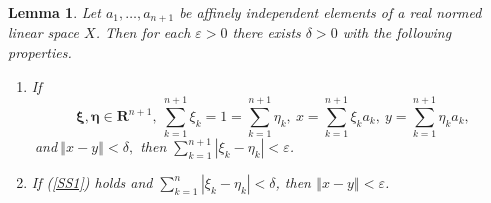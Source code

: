 \documentclass[11pt]{article}%
\newtheorem{lemma}[theorem]{Lemma}
\begin{document}
\begin{lemma}
\label{aug04l1A}Let $a_{1},\ldots,a_{n+1}$ be affinely independent elements of
a real normed linear space $X$. Then for each $\varepsilon>0$ there exists
$\delta>0$ with the following properties.

\begin{enumerate}
\item[\emph{(i)}] If%
\begin{equation}
\ \mathbf{\xi},\mathbf{\eta}\in\mathbf{R}^{n+1},\ \sum_{k=1}^{n+1}\xi
_{k}=1=\sum_{k=1}^{n+1}\eta_{k},\ x=\sum_{k=1}^{n+1}\xi_{k}a_{k}%
,\ y=\sum_{k=1}^{n+1}\eta_{k}a_{k}, \label{SS1}%
\end{equation}
$\ $and$\ \left\Vert x-y\right\Vert <\delta,$ then $\sum_{k=1}^{n+1}\left\vert
\xi_{k}-\eta_{k}\right\vert <\varepsilon$.

\item[\emph{(ii)}] If \emph{(\ref{SS1})} holds and $\sum_{k=1}^{n}\left\vert
\xi_{k}-\eta_{k}\right\vert <\delta$, then $\left\Vert x-y\right\Vert
<\varepsilon$.
\end{enumerate}
\end{lemma}
\end{document}
